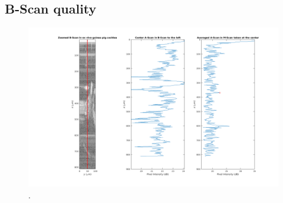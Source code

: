 \documentclass{article}
\begin{document}
\subsection{B-Scan quality}\label{BScansection}
\hypertarget{BScansection}{}

\par{}

\begin{figure}[!h]
	\centering
	\includegraphics[width=\textwidth]{Data for Probe Writeup/Data 2022-2-17/BScan v AScan.png}
	\caption{.}
\end{figure}
\end{document}
